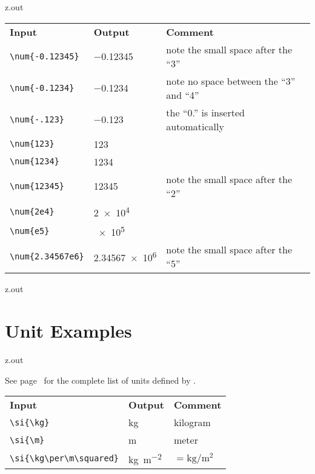 \begin{VerbatimOut}{z.out}
\noindent\begin{tabular}{@{}lll@{}}
  \bfseries Input& \bfseries Output& \bfseries Comment\\
  \tabularspace
  \verb+\num{-0.12345}+& \num{-0.12345}& note the small space after the ``3''\\
  \verb+\num{-0.1234}+&
    \num{-0.1234}&
    note no space between the ``3'' and ``4''\\
  \verb+\num{-.123}+& \num{-.123}& the ``0.'' is inserted automatically\\
  \verb+\num{123}+& \num{123}\\
  \verb+\num{1234}+& \num{1234}\\
  \verb+\num{12345}+& \num{12345}& note the small space after the ``2''\\
  \verb+\num{2e4}+& \num{2e4}\\
  \verb+\num{e5}+& \num{e5}\\
  \verb+\num{2.34567e6}+&
    \num{2.34567e6}&
    note the small space after the ``5''\\
\end{tabular}
\end{VerbatimOut}

\MyIO


\begin{VerbatimOut}{z.out}

\section{Unit Examples}
\end{VerbatimOut}

\MyIO


\begin{VerbatimOut}{z.out}

See page~\pageref{se:Complete-List-of-Units}
for the complete list
of units defined by \PurdueThesisLogo.

\noindent\begin{tabular}{@{}lll@{}}
  \bfseries Input& \bfseries Output& \bfseries Comment\\
  \tabularspace
  \verb+\si{\kg}+& \si{\kg}& kilogram\\
  \verb+\si{\m}+& \si{\m}& meter\\
  \verb+\si{\kg\per\m\squared}+&
    \si{\kg\per\m\squared}&
    \(= \si{\kg}/\si{\m\squared}\)\\
\end{tabular}
\end{VerbatimOut}

